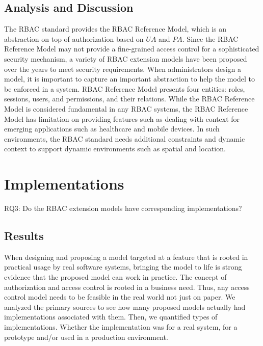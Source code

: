 \subsection{Analysis and Discussion}

The RBAC standard provides the RBAC Reference Model, which is an abstraction on top of authorization based on $UA$ and $PA$. Since the RBAC Reference Model may not provide a fine-grained access control for a sophisticated
security mechanism, a variety of RBAC extension models have been proposed over the years to meet
security requirements. When administrators design a model, it is important to capture an important abstraction to help the model to be enforced in a system. RBAC Reference Model presents four entities: roles, sessions, users, and permissions, and their relations. While the RBAC Reference Model is considered fundamental in any RBAC systems, the RBAC Reference Model has limitation on providing features such as dealing with context for emerging applications such as healthcare and mobile devices. In such environments, the RBAC standard needs additional constraints and dynamic context to support dynamic environments such as spatial and location. 





\section{Implementations} \label{sec:implementations}

RQ3: Do the RBAC extension models have corresponding implementations?

\subsection{Results}

When designing and proposing a model targeted at a feature that is rooted in practical
usage by real software systems, bringing the model to life is strong evidence that the
proposed model can work in practice. The concept of authorization and access control
is rooted in a business need. Thus, any access control model needs to be feasible
in the real world not just on paper. We analyzed the primary sources to see how many
proposed models actually had implementations associated with them.  Then, we quantified
types of implementations. Whether the implementation was for a real system, for a prototype
and/or used in a production environment.


